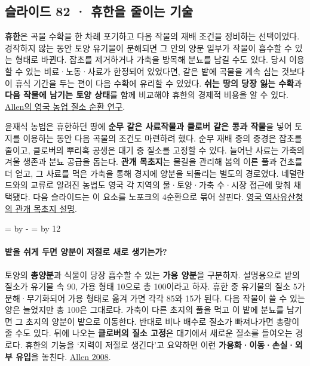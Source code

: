\documentclass[10pt,a4paper]{article}
\newcommand{\ReserveQuestionSpace}{%
  \par\begingroup
  \dimen0=\pagegoal \advance\dimen0 by -\pagetotal
  \dimen2=\baselineskip \multiply\dimen2 by 12
  \ifdim\dimen0<\dimen2 \newpage\fi
  \endgroup}
\begin{document}
\subsection{슬라이드 82 · 휴한을 줄이는 기술}
\textbf{휴한}은 곡물 수확을 한 차례 포기하고 다음 작물의 재배 조건을 정비하는 선택이었다. 경작하지 않는 동안 토양 유기물이 분해되면 그 안의 양분 일부가 작물이 흡수할 수 있는 형태로 바뀐다. 잡초를 제거하거나 가축을 방목해 분뇨를 남길 수도 있다. 당시 이용할 수 있는 비료·노동·사료가 한정되어 있었다면, 같은 밭에 곡물을 계속 심는 것보다 이 휴식 기간을 두는 편이 다음 수확에 유리할 수 있었다. \textbf{쉬는 땅의 당장 잃는 수확}과 \textbf{다음 작물에 남기는 토양 상태}를 함께 비교해야 휴한의 경제적 비용을 알 수 있다. \href{https://doi.org/10.1017/S0022050708000065}{Allen의 영국 농업 질소 순환 연구}.\par

윤재식 농법은 휴한하던 땅에 \textbf{순무 같은 사료작물과 클로버 같은 콩과 작물}을 넣어 토지를 이용하는 동안 다음 곡물의 조건도 마련하려 했다. 순무 재배 중의 중경은 잡초를 줄이고, 클로버의 뿌리혹 공생은 대기 중 질소를 고정할 수 있다. 늘어난 사료는 가축의 겨울 생존과 분뇨 공급을 돕는다. \textbf{관개 목초지}는 물길을 관리해 봄의 이른 풀과 건초를 더 얻고, 그 사료를 먹은 가축을 통해 경지에 양분을 되돌리는 별도의 경로였다. 네덜란드와의 교류로 알려진 농법도 영국 각 지역의 물·토양·가축 수·시장 접근에 맞춰 채택됐다. 다음 슬라이드는 이 요소를 노포크의 4순환으로 묶어 살핀다. \href{https://historicengland.org.uk/images-books/publications/iha-water-meadows/heag237-water-meadows/}{영국 역사유산청의 관개 목초지 설명}.\par

\ReserveQuestionSpace
\paragraph{밭을 쉬게 두면 양분이 저절로 새로 생기는가?}

토양의 \textbf{총양분}과 식물이 당장 흡수할 수 있는 \textbf{가용 양분}을 구분하자. 설명용으로 밭의 질소가 유기물 속 90, 가용 형태 10으로 총 100이라고 하자. 휴한 중 유기물의 질소 5가 분해·무기화되어 가용 형태로 옮겨 가면 각각 85와 15가 된다. 다음 작물이 쓸 수 있는 양은 늘었지만 총 100은 그대로다. 가축이 다른 초지의 풀을 먹고 이 밭에 분뇨를 남기면 그 초지의 양분이 밭으로 이동한다. 반대로 비나 배수로 질소가 빠져나가면 총량이 줄 수도 있다. 뒤에 나오는 \textbf{클로버의 질소 고정}은 대기에서 새로운 질소를 들여오는 경로다. 휴한의 기능을 ‘지력이 저절로 생긴다’고 요약하면 이런 \textbf{가용화·이동·손실·외부 유입}을 놓친다. \href{https://doi.org/10.1017/S0022050708000065}{Allen 2008}.\par
\end{document}
